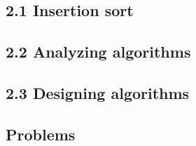 
\subsection*{2.1 Insertion sort}


\subsection*{2.2 Analyzing algorithms}


\subsection*{2.3 Designing algorithms}


\subsection*{Problems}

